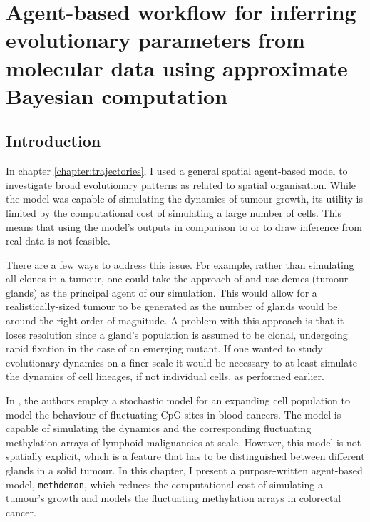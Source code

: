 \chapter{Agent-based workflow for inferring evolutionary parameters from
molecular data using approximate Bayesian computation}\label{chapter:methdemon}


\section{Introduction}
In chapter \ref{chapter:trajectories}, I used a general spatial agent-based
model to investigate broad evolutionary patterns as related to spatial
organisation. While the model was capable of simulating the dynamics of tumour
growth, its utility is limited by the computational cost of simulating a large
number of cells. This means that using the model's outputs in comparison to or
to draw inference from real data is not feasible. \par
There are a few ways to address this issue. For example, rather than simulating
all clones in a tumour, one could take the approach of
\cite{sottoriva_big_2015} and use demes (tumour glands) as the principal agent
of our simulation. This would allow for a realistically-sized tumour to be
generated as the number of glands would be around the right order of magnitude.
A problem with this approach is that it loses resolution since a gland's
population is assumed to be clonal, undergoing rapid fixation in the case of an
emerging mutant. If one wanted to study evolutionary dynamics on a finer scale
it would be necessary to at least simulate the dynamics of cell lineages, if
not individual cells, as performed earlier. \par
In \cite{gabbutt_evolutionary_2023}, the authors employ a stochastic model for
an expanding cell population to model the behaviour of fluctuating CpG sites in
blood cancers. The model is capable of simulating the dynamics and the
corresponding fluctuating methylation arrays of lymphoid malignancies at scale.
However, this model is not spatially explicit, which is a feature that has to
be distinguished between different glands in a solid tumour. In this chapter, I
present a purpose-written agent-based model, \texttt{methdemon}, which reduces
the computational cost of simulating a tumour's growth and models the
fluctuating methylation arrays in colorectal cancer.

